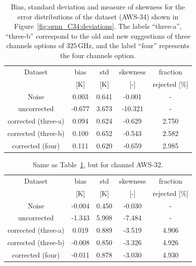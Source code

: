 \documentclass[12pt]{article}
\begin{document}
\begin{table}[!p]
	\centering
	\begin{tabular}[b]{c|c|c|c|c}
		Dataset  		  &   bias &   std &   skewness & fraction  \\
		&   [K]  &   [K] & [-] & rejected [\%]\\
		\hline
		Noise                       &  0.003 & 0.641 &             -0.001 &      - \\
		uncorrected                 & -0.677 & 3.673 &            -10.321 &      - \\
		corrected (three-a) 		&  0.094 & 0.624 &             -0.629 &      2.750 \\
		corrected (three-b) 		&  0.100 & 0.652 &             -0.543 &      2.582 \\
		corrected (four)   			&  0.111 & 0.620 &             -0.659 &      2.985 \\
		\hline
	\end{tabular}
	\caption{ Bias, standard deviation and measure of skewness for the error distributions of the dataset (AWS-34) shown in Figure~\ref{fig:qrnn_C34:deviations}. The labels ``three-a'', ``three-b'' correspond to the old and new suggestions of three channels options of 325\,GHz, and the label ``four'' represents the four channels option.}
	\label{tab:qrnn:C34}
\end{table}

\begin{table}[!p]
	\centering
	\begin{tabular}[b]{c|c|c|c|c}
		Dataset  		  &   bias &   std &   skewness & fraction  \\
		&   [K]  &   [K] & [-] & rejected [\%]\\
		\hline
		Noise                       & -0.004 & 0.450 &             -0.030 &      - \\
		uncorrected                 & -1.343 & 5.908 &             -7.484 &      - \\
		corrected (three-a)  		&  0.019 & 0.889 &             -3.519 &      4.906 \\	 
		corrected (three-b)  		& -0.008 & 0.850 &             -3.326 &      4.926 \\			
		corrected (four)    		& -0.011 & 0.878 &             -3.030 &      4.930 \\
		\hline
	\end{tabular}
	\caption{ Same as Table~\ref{tab:qrnn:C34}, but for channel AWS-32.}
	\label{tab:qrnn:C32}
\end{table}
\end{document}
